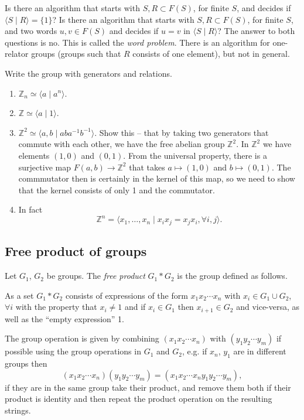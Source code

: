 Is there an algorithm that starts with $S, R \subset F(S)$, for finite
$S$, and decides if $\langle S \mid R \rangle = \{ 1 \}$? Is there an
algorithm that starts with $S, R \subset F(S)$, for finite
$S$, and two words $u, v \in F(S)$ and decides if $u = v$ in
$\langle S \mid R \rangle$? The answer to both questions is no. This
is called the \emph{word problem}. There is an algorithm for
one-relator groups (groups such that $R$ consists of one element), but
not in general.

\begin{xmpl}
Write the group with generators and relations.
\begin{enumerate}
  \item{
    $\mathbb{Z}_n \simeq \langle a \mid a^n \rangle$.
  }
  \item{
    $\mathbb{Z} \simeq \langle a \mid 1 \rangle$.
  }
  \item{
    $\mathbb{Z}^2 \simeq \langle a, b \mid a b a^{-1} b^{-1} \rangle$.
    Show this -- that by taking two generators that commute with each
    other, we have the free abelian group $\mathbb{Z}^2$. In
    $\mathbb{Z}^2$ we have elements $(1,0)$ and $(0,1)$. From the
    universal property, there is a surjective map $F(a, b) \to
    \mathbb{Z}^2$ that takes $a \mapsto (1, 0)$ and $b \mapsto (0, 1)$.
    The commmutator then is certainly in the kernel of this map, so we
    need to show that the kernel consists of only 1 and the commutator.
  }
  \item{
    In fact
    $$
    \mathbb{Z}^n
      = \langle x_1, \dots, x_n
          \mid x_i x_j = x_j x_i, \forall i, j
        \rangle.
    $$
  }
\end{enumerate}
\end{xmpl}

\subsection{Free product of groups}
\begin{defn}
Let $G_1$, $G_2$ be groups. The \emph{free product}
$G_1 \ast G_2$ is the group defined as follows.

As a set $G_1 \ast G_2$ consists of expressions of the form
$x_1 x_2 \cdots x_n$ with $x_i \in G_1 \cup G_2$, $\forall i$ with the
property that $x_i \neq 1$ and if $x_i \in G_1$ then $x_{i+1} \in
G_2$ and vice-versa, as well as the ``empty expression'' 1.

The group operation is given by combining
$(x_1 x_2 \cdots x_n)$ with
$(y_1 y_2 \cdots y_m)$ if possible using the group operations in $G_1$
and $G_2$, e.g. if $x_n$, $y_1$ are in different groups then
$$
(x_1 x_2 \cdots x_n)
(y_1 y_2 \cdots y_m) =
(x_1 x_2 \cdots x_n y_1 y_2 \cdots y_m),
$$
if they are in the same group take their product,
and remove them both if their product
is identity and then repeat the product operation on the resulting strings.
\end{defn}

